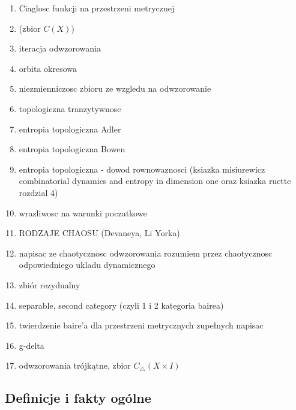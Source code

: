 \documentclass[licencjacka]{pwr_wmat_praca_dyplomowa}
\theoremstyle{plain}
\numberwithin{theorem}{chapter}
\theoremstyle{definition}
\numberwithin{theorem}{chapter}
\newtheorem{definition}[theorem]{Definicja}
\begin{document}
\begin{enumerate}
\item Ciaglosc funkcji na przestrzeni metrycznej 
\item (zbior $C(X)$)


\item iteracja odwzorowania
\item orbita okresowa
\item niezmienniczosc zbioru ze wzgledu na odwzorowanie

\item topologiczna tranzytywnosc
\item entropia topologiczna Adler
\item entropia topologiczna Bowen
\item entropia topologiczna - dowod rownowaznosci (ksiazka misiurewicz combinatorial dynamics and entropy in dimension one oraz ksiazka ruette rozdzial 4)
\item wrazliwosc na warunki poczatkowe
\item RODZAJE CHAOSU (Devaneya, Li Yorka)


\item napisac ze chaotycznosc odwzorowania rozumiem przez chaotycznosc odpowiedniego ukladu dynamicznego

\item zbiór rezydualny
\item separable, second category (czyli 1 i 2 kategoria bairea)
\item twierdzenie baire'a dla przestrzeni metrycznych zupełnych napisac
\item g-delta




\item odwzorowania trójkątne, zbior $C_\triangle(X \times I)$

\end{enumerate}



\subsection{Definicje i fakty ogólne}
\end{document}
